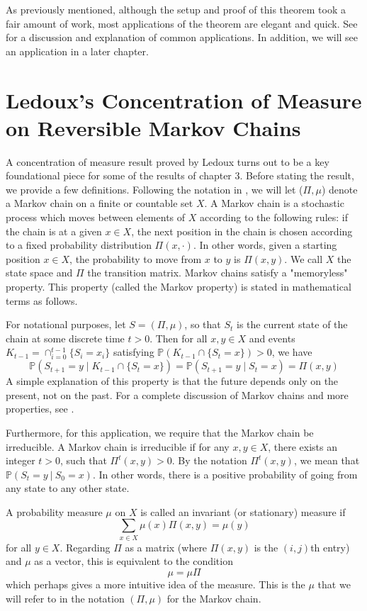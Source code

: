 \documentclass[12pt]{report}
\theoremstyle{definition}
\begin{document}
As previously mentioned, although the setup and proof of this theorem took a fair amount of work, most applications of the theorem are elegant and quick.  See \cite{Steele} for a discussion and explanation of common applications.  In addition, we will see an application in a later chapter.  

\section{Ledoux's Concentration of Measure on Reversible Markov Chains} 
A concentration of measure result proved by Ledoux \cite{LedouxCOM} turns out to be a key foundational piece for some of the results of chapter 3.  Before stating the result, we provide a few definitions.  Following the notation in \cite{LedouxCOM}, we will let ($\Pi,\mu$) denote a Markov chain on a finite or countable set $X$.  A Markov chain is a stochastic process which moves between elements of $X$ according to the following rules:  if the chain is at a given $x\in X$, the next position in the chain is chosen according to a fixed probability distribution $\Pi(x,\cdot)$.  In other words, given a starting position $x\in X$, the probability to move from $x$ to $y$ is $\Pi(x,y)$.  We call $X$ the state space and $\Pi$ the transition matrix.  Markov chains satisfy a "memoryless" property.  This property (called the Markov property) is stated in mathematical terms as follows.  

For notational purposes, let $S=(\Pi,\mu)$, so that $S_t$ is the current state of the chain at some discrete time $t>0$.  Then for all $x,y\in X$ and events $K_{t-1}=\cap_{i=0}^{t-1}\{S_i=x_i\}$ satisfying $\mathbb{P}(K_{t-1}\cap \{S_t=x\})>0$, we have 
$$
\mathbb{P}(S_{t+1}=y \; | \; K_{t-1}\cap\{S_t=x\})=\mathbb{P}(S_{t+1}=y \; | \; S_t=x)=\Pi(x,y)
$$
A simple explanation of this property is that the future depends only on the present, not on the past.  For a complete discussion of Markov chains and more properties, see \cite{LPW}.  

Furthermore, for this application, we require that the Markov chain be irreducible.  A Markov chain is irreducible if for any $x,y\in X$, there exists an integer $t>0$, such that $\Pi^t(x,y)>0$.  By the notation $\Pi^t(x,y)$, we mean that $\mathbb{P}(S_t=y \: | \: S_0=x )$.  In other words, there is a positive probability of going from any state to any other state.  

A probability measure $\mu$ on $X$ is called an invariant (or stationary) measure if 
$$
\sum_{x\in X} \mu(x)\Pi(x,y)=\mu(y)
$$
for all $y\in X$.  Regarding $\Pi$ as a matrix (where $\Pi(x,y)$ is the $(i,j)$th entry) and $\mu$ as a vector, this is equivalent to the condition 
$$
\mu=\mu\Pi
$$
which perhaps gives a more intuitive idea of the measure.  This is the $\mu$ that we will refer to in the notation $(\Pi,\mu)$ for the Markov chain.  
\end{document}
